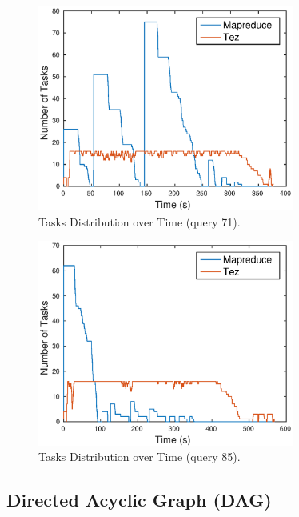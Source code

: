 \documentclass[10pt]{article}
\begin{document}
\begin{figure}
\begin{center}
\includegraphics[width=0.75\textwidth]{pic/q1c_task_distribution_71}
\caption{Tasks Distribution over Time (query 71).}
\label{fig:q1c_tasks_71}
\end{center}
\end{figure}

\begin{figure}
\begin{center}
\includegraphics[width=0.75\textwidth]{pic/q1c_task_distribution_85}
\caption{Tasks Distribution over Time (query 85).}
\label{fig:q1c_tasks_85}
\end{center}
\end{figure}


\subsection{Directed Acyclic Graph (DAG)}
\end{document}

